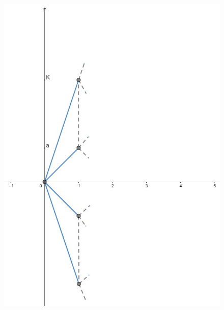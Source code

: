 \documentclass[11pt,largemargins]{homework}
\begin{document}
\begin{enumerate}
\begin{figure}[htb]
\includegraphics[scale=0.45]{martingalaex7.jpg}
  \end{figure}
  

\end{enumerate}
\end{document}
